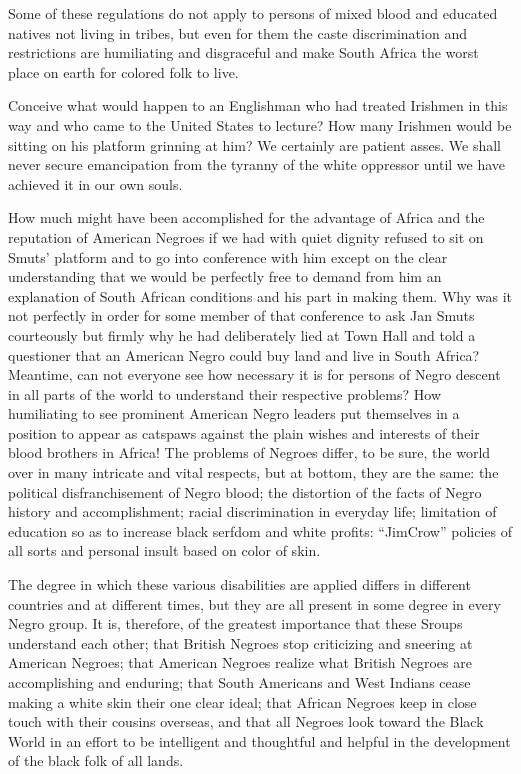 \documentclass[letterpaper,10pt,english]{jupyterBook}
\begin{document}
\sphinxAtStartPar
Some of these regulations do not apply to persons of mixed blood and educated natives not living in tribes, but even for them the caste discrimination and restrictions are humiliating and disgraceful and make South Africa the worst place on earth for colored folk to live.

\sphinxAtStartPar
Conceive what would happen to an Englishman who had treated Irishmen in this way and who came to the United States to lecture? How many Irishmen would be sitting on his platform grinning at him? We certainly are patient asses. We shall never secure emancipation from the tyranny of the white oppressor until we have achieved it in our own souls.

\sphinxAtStartPar
How much might have been accomplished for the advantage of Africa and the reputation of American Negroes if we had with quiet dignity refused to sit on Smuts’ platform and to go into conference with him except on the clear understanding that we would be perfectly free to demand from him an explanation of South African conditions and his part in making them. Why was it not perfectly in order for some member of that conference to ask Jan Smuts courteously but firmly why he had deliberately lied at Town Hall and told a questioner that an American Negro could buy land and live in South Africa? Meantime, can not everyone see how necessary it is for persons of Negro descent in all parts of the world to understand their respective problems? How humiliating to see prominent American Negro leaders put themselves in a position to appear as catspaws against the plain wishes and interests of their blood brothers in Africa!
The problems of Negroes differ, to be sure, the world over in many intricate and vital respects, but at bottom, they are the same: the political disfranchisement of Negro blood; the distortion of the facts of Negro history and accomplishment; racial discrimination in everyday life; limitation of education so as to increase black serfdom and white profits: “Jim\sphinxhyphen{}Crow” policies of all sorts and personal insult based on color of skin.

\sphinxAtStartPar
The degree in which these various disabilities are applied differs in different countries and at different times, but they are all present in some degree in every Negro group. It is, therefore, of the greatest importance that these Sroups understand each other; that British Negroes stop criticizing and sneering at American Negroes; that American Negroes realize what British Negroes are accomplishing and enduring; that South Americans and West Indians cease making a white skin their one clear ideal; that African Negroes keep in close touch with their cousins overseas, and that all Negroes look toward the Black World in an effort to be intelligent and thoughtful and helpful in the development of the black folk of all lands.
\end{document}
